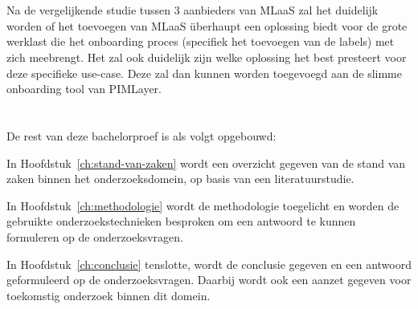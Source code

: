 \section{}%
\label{sec:onderzoeksdoelstelling}

Na de vergelijkende studie tussen 3 aanbieders van MLaaS zal het duidelijk worden of het toevoegen van MLaaS überhaupt een oplossing biedt voor de grote werklast die het onboarding proces (specifiek het toevoegen van de labels) met zich meebrengt. Het zal ook duidelijk zijn welke oplossing het best presteert voor deze specifieke use-case. Deze zal dan kunnen worden toegevoegd aan de slimme onboarding tool van PIMLayer.

\section{}%
\label{sec:opzet-bachelorproef}


De rest van deze bachelorproef is als volgt opgebouwd:

In Hoofdstuk~\ref{ch:stand-van-zaken} wordt een overzicht gegeven van de stand van zaken binnen het onderzoeksdomein, op basis van een literatuurstudie.

In Hoofdstuk~\ref{ch:methodologie} wordt de methodologie toegelicht en worden de gebruikte onderzoekstechnieken besproken om een antwoord te kunnen formuleren op de onderzoeksvragen.


In Hoofdstuk~\ref{ch:conclusie} tenslotte, wordt de conclusie gegeven en een antwoord geformuleerd op de onderzoeksvragen. Daarbij wordt ook een aanzet gegeven voor toekomstig onderzoek binnen dit domein.
